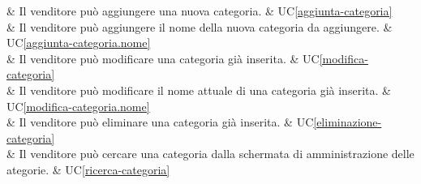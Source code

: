  & Il venditore può aggiungere una nuova categoria. & UC\ref{aggiunta-categoria} \\
    
 & Il venditore può aggiungere il nome della nuova categoria da aggiungere. & UC\ref{aggiunta-categoria.nome} \\
    
 & Il venditore può modificare una categoria già inserita. & UC\ref{modifica-categoria} \\
    
 & Il venditore può modificare il nome attuale di una categoria già inserita. & UC\ref{modifica-categoria.nome} \\
    
 & Il venditore può eliminare una categoria già inserita. & UC\ref{eliminazione-categoria} \\
    
 & Il venditore può cercare una categoria dalla schermata di amministrazione delle ategorie. & UC\ref{ricerca-categoria} \\